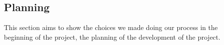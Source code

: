 \subsection{Planning}
This section aims to show the choices we made doing our process in the beginning of the project, the planning of the development of the project.





\newpage